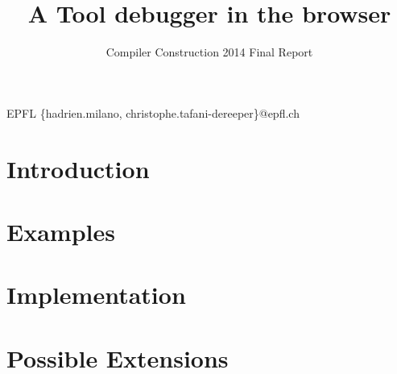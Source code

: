 \documentclass[nocopyrightspace,11pt,authoryear,preprint]{sigplanconf}
\begin{document}


\title{A Tool debugger in the browser}
\subtitle{Compiler Construction 2014 Final Report}

           {EPFL}
           {\{hadrien.milano, christophe.tafani-dereeper\}@epfl.ch}

\maketitle

\section{Introduction}


\section{Examples}


\section{Implementation}


\section{Possible Extensions}




\end{document}
